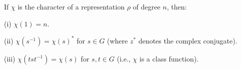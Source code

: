 If $\chi$ is the character of a representation $\rho$ of degree $n$, then:

(i) $\chi(1) = n$.

(ii) $\chi(s^{-1}) = \chi(s)^*$ for $s \in G$ (where $z^*$ denotes the complex conjugate).

(iii) $\chi(tst^{-1}) = \chi(s)$ for $s, t \in G$ (i.e., $\chi$ is a class function).
